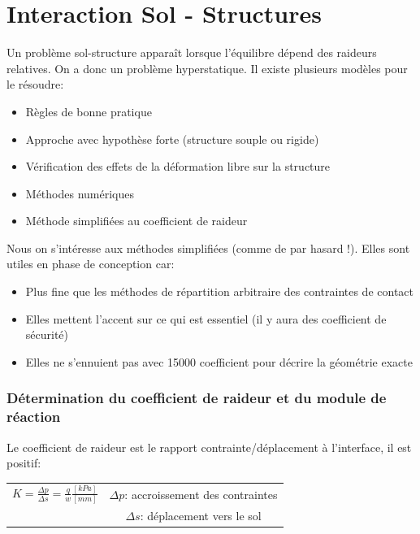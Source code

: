 \part{Interaction Sol - Structures}

Un problème sol-structure apparaît lorsque l'équilibre dépend des raideurs relatives. On a donc un problème hyperstatique. Il existe plusieurs modèles pour le résoudre:

\begin{itemize}
    \item Règles de bonne pratique
    \item Approche avec hypothèse forte (structure souple ou rigide)
    \item Vérification des effets de la déformation libre sur la structure
    \item Méthodes numériques
    \item Méthode simplifiées au coefficient de raideur
\end{itemize}

\medskip

Nous on s'intéresse aux méthodes simplifiées (comme de par hasard !). Elles sont utiles en phase de conception car:

\begin{itemize}
    \item Plus fine que les méthodes de répartition arbitraire des contraintes de contact
    \item Elles mettent l'accent sur ce qui est essentiel (il y aura des coefficient de sécurité)
    \item Elles ne s'ennuient pas avec 15000 coefficient pour décrire la géométrie exacte
\end{itemize} 

\section{Détermination du coefficient de raideur et du module de réaction}

Le coefficient de raideur est le rapport contrainte/déplacement à l'interface, il est positif:

\begin{center}
\begin{tabular}{c|c}
    $ K = \frac{\Delta p}{\Delta s} = \frac{q}{w} \frac{[kPa]}{[mm]} $  
                & $\Delta p$: accroissement des contraintes \\
                & $\Delta s$: déplacement vers le sol 
\end{tabular}
\end{center}

